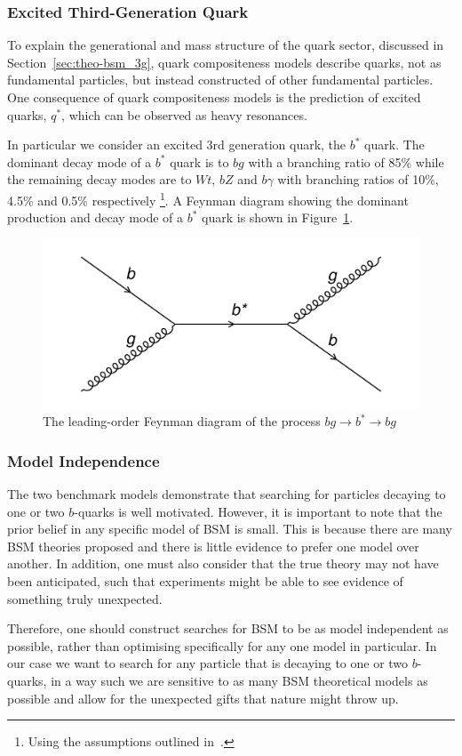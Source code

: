 \subsubsection{Excited Third-Generation Quark}

To explain the generational and mass structure of the quark sector, discussed in Section~\ref{sec:theo-bsm_3g},
quark compositeness models describe quarks, not as fundamental particles, but instead constructed of other fundamental particles.
One consequence of quark compositeness models is the prediction of excited quarks, $q^{*}$, which can be observed as heavy resonances.

In particular we consider an excited 3rd generation quark, the $b^{*}$ quark.
The dominant decay mode of a $b^{*}$ quark is to $bg$ with a branching ratio of 85\%
while the remaining decay modes are to $Wt$, $bZ$ and $b\gamma$ with branching ratios of 10\%, 4.5\% and 0.5\% respectively
\footnote{Using the assumptions outlined in~\cite{theo-bsm_bstar}.}.
A Feynman diagram showing the  dominant production and decay mode of a $b^*$ quark is shown in Figure~\ref{fig:theo-bsm_bstar}.

\begin{figure}[!hbt]
  \begin{center}
    \includegraphics[width=0.7\linewidth, angle=0]{figs/Theory/bsm_bstar.png}
  \end{center}
  \caption{The leading-order Feynman diagram of the process $bg \to b^* \to bg$}
  \label{fig:theo-bsm_bstar}
\end{figure}


\subsubsection{Model Independence}

The two benchmark models demonstrate that searching for particles decaying to one or two $b$-quarks
is well motivated.
However, it is important to note that the prior belief in any specific model of BSM is small.
This is because there are many BSM theories proposed
and there is little evidence to prefer one model over another.
In addition, one must also consider that the true theory may not have been anticipated,
such that experiments might be able to see evidence of something truly unexpected.

Therefore, one should construct searches for BSM to be as model independent as possible,
rather than optimising specifically for any one model in particular.
In our case we want to search for any particle that is decaying to one or two
$b$-quarks, in a way such we are sensitive to as many BSM theoretical models as possible
and allow for the unexpected gifts that nature might throw up.
